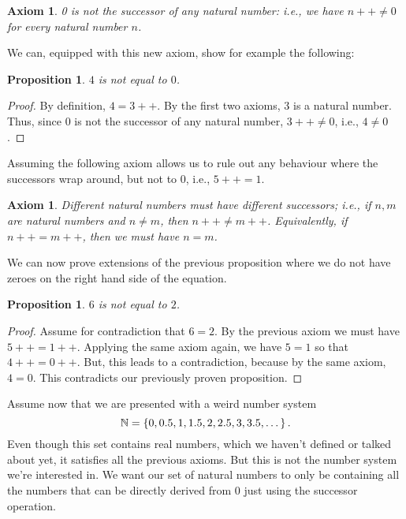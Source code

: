 \documentclass[a4paper, twocolumn]{report}
\newcounter{dummy} \numberwithin{dummy}{section}
\newcounter{axmcntr} \numberwithin{axmcntr}{chapter}
\newtheorem{axm}[axmcntr]{Axiom}
\newtheorem{prp}[dummy]{Proposition}
\begin{document}
\begin{axm}
  0 is not the successor of any natural number: i.e., we have $n++ \neq 0$ for
  every natural number $n$.
\end{axm}

We can, equipped with this new axiom, show for example the following:

\begin{prp}
  $4$ is not equal to $0$.
\end{prp}
\begin{proof}
  By definition, $4 = 3++$. By the first two axioms, $3$ is a natural number.
  Thus, since $0$ is not the successor of any natural number, $3++ \neq 0$,
  i.e., $4 \neq 0$. 
\end{proof}

Assuming the following axiom allows us to rule out any behaviour where the
successors wrap around, but not to $0$, i.e., $5++ = 1$.

\begin{axm}
  Different natural numbers must have different successors; i.e., if $n, m$ are
  natural numbers and $n \neq m$, then $n++ \neq m++$. Equivalently, if $n++ =
  m++$, then we must have $n = m$.
\end{axm}

We can now prove extensions of the previous proposition where we do not have zeroes
on the right hand side of the equation.

\begin{prp}
  $6$ is not equal to $2$.
\end{prp}
\begin{proof}
  Assume for contradiction that $6 = 2$. By the previous axiom we must have
  $5++ = 1++$.  Applying the same axiom again, we have $5 = 1$ so that $4++ =
  0++$. But, this leads to a contradiction, because by the same axiom, $4 = 0$.
  This contradicts our previously proven proposition.
\end{proof}

Assume now that we are presented with a weird number system
\begin{equation}
  \notag
  \mathbb{N} = \left\{ 0, 0.5, 1, 1.5, 2, 2.5, 3, 3.5, \dots \right\}.
\end{equation}
Even though this set contains real numbers, which we haven't defined or talked
about yet, it satisfies all the previous axioms. But this is not the number
system we're interested in. We want our set of natural numbers to only be
containing all the numbers that can be directly derived from $0$ just using the
successor operation.
\end{document}
